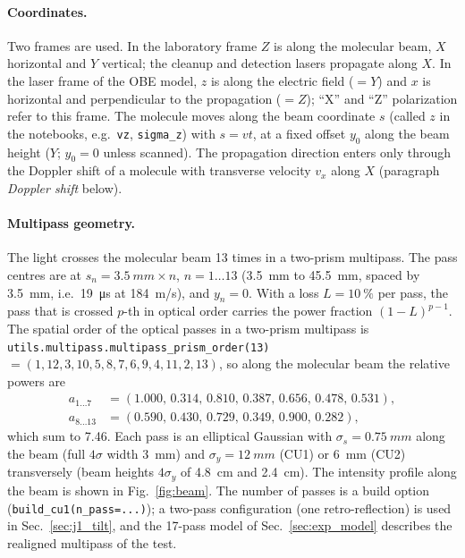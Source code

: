 \documentclass[11pt,a4paper,oneside]{report}
\newcommand{\code}[1]{\texttt{#1}}
\newcommand{\sigs}{\sigma_{s}}
\newcommand{\sigy}{\sigma_{y}}
\begin{document}
\paragraph{Coordinates.} Two frames are used. In the laboratory frame $Z$ is along the
molecular beam, $X$ horizontal and $Y$ vertical; the cleanup and detection lasers propagate
along $X$. In the laser frame of the OBE model, $z$ is along the electric field ($=Y$) and $x$ is
horizontal and perpendicular to the propagation ($=Z$); ``X'' and ``Z'' polarization refer to
this frame. The molecule moves along the beam coordinate $s$ (called $z$ in the notebooks, e.g.\
\code{vz}, \code{sigma\_z}) with $s=vt$, at a fixed offset $y_0$ along the beam height ($Y$;
$y_0=0$ unless scanned). The propagation direction enters only through the Doppler shift of a
molecule with transverse velocity $v_x$ along $X$ (paragraph \emph{Doppler shift} below).

\paragraph{Multipass geometry.} The light crosses the molecular beam 13 times in a two-prism
multipass. The pass centres are at $s_n=\SI{3.5}{mm}\times n$, $n=1\ldots13$ (\SI{3.5}{mm}
to \SI{45.5}{mm}, spaced by \SI{3.5}{mm}, i.e.\ \SI{19}{\micro\second} at \SI{184}{m/s}), and
$y_n=0$. With a loss $L=\SI{10}{\percent}$ per pass, the pass that is crossed $p$-th in
optical order carries the power fraction $(1-L)^{p-1}$. The spatial order of the optical
passes in a two-prism multipass is \code{utils.multipass.multipass\_prism\_order(13)} $=
(1,12,3,10,5,8,7,6,9,4,11,2,13)$, so along the molecular beam the relative powers are
\begin{equation*}
  \begin{aligned}
    a_{1\ldots7}&=(1.000,\,0.314,\,0.810,\,0.387,\,0.656,\,0.478,\,0.531),\\
    a_{8\ldots13}&=(0.590,\,0.430,\,0.729,\,0.349,\,0.900,\,0.282),
  \end{aligned}
\end{equation*}
which sum to 7.46. Each pass is an elliptical Gaussian with $\sigs=\SI{0.75}{mm}$ along the
beam (full $4\sigma$ width \SI{3}{mm}) and $\sigy=\SI{12}{mm}$ (CU1) or \SI{6}{mm} (CU2)
transversely (beam heights $4\sigy$ of \SI{4.8}{cm} and \SI{2.4}{cm}). The intensity profile
along the beam is shown in Fig.~\ref{fig:beam}. The number of passes is a build option
(\code{build\_cu1(n\_pass=...)}); a two-pass configuration (one retro-reflection) is used in
Sec.~\ref{sec:j1_tilt}, and the 17-pass model of Sec.~\ref{sec:exp_model} describes the realigned
multipass of the test.
\end{document}

